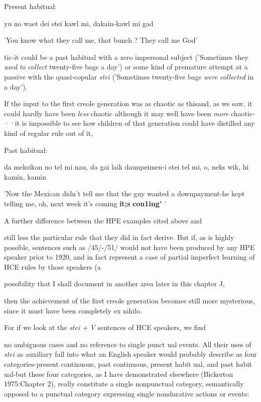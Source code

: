 
\ea\label{ex:54}
 Present habitual:
\glt
\z

yu no waet dei stei kawl mi, dakain-kawl mi gad

'You know what they call me, that bunch ? They call me God'

tic-it could be a past habitual with a zero impersonal subject ('Some\-times they \textit{used} \textit{to} \textit{collect} twenty-five bags a day') or some kind of premature attempt at a passive with the quasi-copular \textit{stei} ('Sometimes twenty-five bags \textit{were} \textit{collected} in a day').

If the input to the first creole generation was as chaotic as this\-and, as we saw, it could hardly have been \textit{less} chaotic although it may well have been \textit{more} chaotic-··it is impossible to see how children of that generation could have distilled any kind of regular rule out of it,

\ea\label{ex:55}

\glt
\z

Past habitual:

da meksikan no tel mi nau, da gai laik daunpeimen{}-i stei tel mi, o, neks wik, hi kamin, kamin

'Now the Mexican didn't tell me that the guy wanted a down\-payment-he kept telling me, oh, next week it's coming \textbf{it;s} \textbf{con1ing' }'

A further difference between the HPE examples cited above and

still less the particular rule that they did in fact derive. But if, as is highly possible, sentences such as /45/-/51/ would not have been produced by any HPE speaker prior to 1920, and in fact represent a case of partial imperfect learning of HCE rules by those speakers (a

possibility that I shall document in another area later in this chapter J,

then the achievement of the first creole generation becomes still more mysterious, since it must have been completely ex nihilo.

For if we look at the \textit{stei} \textit{+} \textit{V} sentences of HCE speakers, we find

no ambiguous cases and no reference to single punct ual events. All their uses of \textit{stei} as auxiliary fall into what an English speaker would probably describe as four categories-present continuous, past con\-tinuous, present habit ual, and past habit ual-but these four categories, as I have demonstrated elsewhere (Bickerton 1975:Chapter 2), really constitute a single nonpunctual category, semantically opposed to a punctual category expressing single nondurative actions or events:

